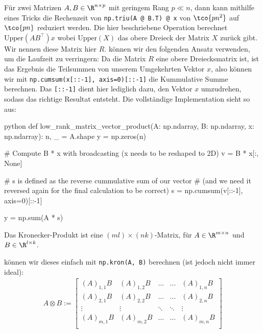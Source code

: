 \inlineex Für zwei Matrizen $A, B \in \R^{n \times p}$ mit geringem Rang $p \ll n$, dann kann mithilfe eines Tricks die Rechenzeit von \verb|np.triu(A @ B.T) @ x| von $\tco{pn^2}$ auf $\tco{pn}$ reduziert werden.
Die hier beschriebene Operation berechnet $\text{Upper}(AB^\top) x$ wobei $\text{Upper}(X)$ das obere Dreieck der Matrix $X$ zurück gibt.
Wir nennen diese Matrix hier $R$.
\innumpy können wir den folgenden Ansatz verwenden, um die Laufzeit zu verringern:
Da die Matrix $R$ eine obere Dreiecksmatrix ist, ist das Ergebnis die Teilsummen von unserem Umgekehrten Vektor $x$, also können wir mit \verb|np.cumsum(x[::-1], axis=0)[::-1]| die Kummulative Summe berechnen.
Das \verb|[::-1]| dient hier lediglich dazu, den Vektor $x$ umzudrehen, sodass das richtige Resultat entsteht.
Die vollständige Implementation sieht so aus:
\begin{code}{python}
    def low_rank_matrix_vector_product(A: np.ndarray, B: np.ndarray, x: np.ndarray):
        n, _ = A.shape
        y = np.zeros(n)

        # Compute B * x with broadcasting (x needs to be reshaped to 2D)
        v = B * x[:, None]

        # s is defined as the reverse cummulative sum of our vector
        # (and we need it reversed again for the final calculation to be correct)
        s = np.cumsum(v[::-1], axis=0)[::-1]

        y = np.sum(A * s)
\end{code}


 Das Kronecker-Produkt ist eine $(ml) \times (nk)$-Matrix, für $A \in \R^{m \times n}$ und $B \in \R^{l \times k}$.

\innumpy können wir dieses einfach mit \verb|np.kron(A, B)| berechnen (ist jedoch nicht immer ideal):
\begin{align*}
    A \otimes B :=
    \begin{bmatrix}
        (A)_{1, 1} B & (A)_{1, 2}B & \ldots & \ldots & (A)_{1, n} B \\
        (A)_{2, 1} B & (A)_{2, 2}B & \ldots & \ldots & (A)_{2, n} B \\
        \vdots       & \vdots      & \ddots & \ddots & \vdots       \\
        (A)_{m, 1} B & (A)_{m, 2}B & \ldots & \ldots & (A)_{m, n} B \\
    \end{bmatrix}
\end{align*}

